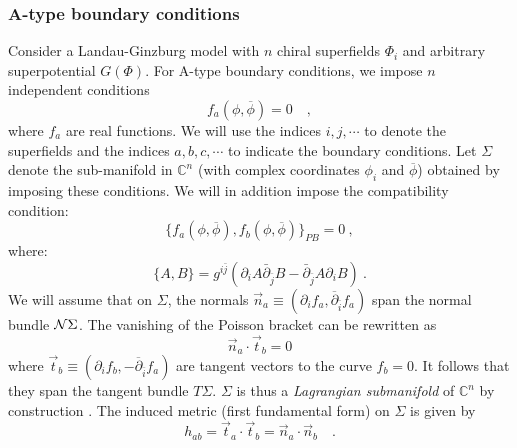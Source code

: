 \documentclass[a4paper,12pt]{article}
\def\Bbb{\mathbb}
\def\BC{\mbox{$\Bbb C$}} \def\BP{\mbox{$\Bbb P$}}
\begin{document}
\subsubsection{A-type boundary conditions}
Consider a Landau-Ginzburg model with $n$ chiral
superfields $\Phi_i$ and arbitrary superpotential $G(\Phi)$. 
For A-type boundary conditions, we impose $n$ independent conditions
\begin{equation}
f_a(\phi,\overline{\phi})=0\quad,
\end{equation}
where $f_a$ are real functions. We will use the indices $i,j,\cdots$ to
denote the superfields and the indices $a,b,c,\cdots$ to indicate the
boundary conditions.
Let $\Sigma$ denote the sub-manifold in 
$\BC^n$ (with complex coordinates
$\phi_i$ and $\overline{\phi}$) obtained by imposing
these conditions. 
We will in addition impose the compatibility condition:
\begin{equation}
\{f_a(\phi,\overline{\phi}),f_b(\phi,\overline{\phi})\}_{PB}=0\ ,
\end{equation}
where:
\begin{equation}
	\{A,B\} = g^{i\bar{j}} \left( \partial_i A 
	\bar{\partial}_{\bar{j}} B -
	\bar{\partial}_{\bar{j}} A
	\partial_i B\right) \ .
\end{equation}
We will assume that on $\Sigma$, the normals $\vec{n}_a
\equiv (\partial_i f_a,\overline{\partial}_{\bar{i}} f_a)$ 
span the normal bundle ${\cal N}\Sigma$. The vanishing of the Poisson
bracket can be rewritten as
\begin{equation}
\vec{n}_a \cdot \vec{t}_b =0
\end{equation}
where 
$\vec{t}_b\equiv 
(\partial_i f_b,-\overline{\partial}_{\bar{i}} f_a)$
are tangent vectors to the curve $f_b=0$. It follows that they span
the tangent bundle $T\Sigma$. $\Sigma$ is thus a {\it Lagrangian
submanifold} of $\BC^n$ by construction 
\cite{harveylawson}. The induced
metric (first fundamental form) on $\Sigma$ is given by
\begin{equation}
h_{ab} = \vec{t}_a \cdot \vec{t}_b = \vec{n}_a \cdot \vec{n}_b \quad.
\end{equation}
\end{document}
